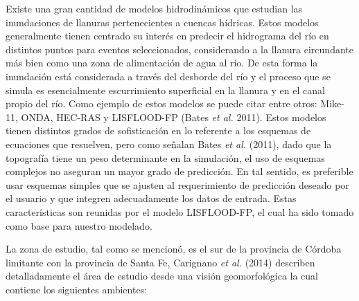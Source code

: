 \documentclass[10pt,a4paper, twoside]{report}
\begin{document}
Existe una gran cantidad de modelos hidrodinámicos que estudian las inundaciones de llanuras pertenecientes a cuencas hídricas. Estos modelos generalmente tienen centrado su interés en predecir el hidrograma del río en distintos puntos para eventos seleccionados, considerando a la llanura circundante más bien como una zona de alimentación de agua al río. De esta forma la inundación está considerada a través del desborde del río y el proceso que se simula es esencialmente escurrimiento superficial en la llanura y en el canal propio del río. Como ejemplo de estos modelos se puede citar entre otros: Mike-11, ONDA, HEC-RAS y LISFLOOD-FP (Bates \textit{et al.} 2011). Estos modelos tienen distintos grados de sofisticación en lo referente a los esquemas de ecuaciones que resuelven, pero como señalan Bates \textit{et al.} (2011), dado que la topografía tiene un peso determinante en la simulación, el uso de esquemas complejos no aseguran un mayor grado de predicción. En tal sentido, es preferible usar esquemas simples que se ajusten al requerimiento de predicción deseado por el usuario y que integren adecuadamente los datos de entrada. Estas características son reunidas por el modelo LISFLOOD-FP, el cual ha sido tomado como base para nuestro modelado.

La zona de estudio, tal como se mencionó, es el sur de la provincia de Córdoba limitante con la provincia de Santa Fe, Carignano \textit{et al.} (2014) describen detalladamente el área de estudio desde una visión geomorfológica la cual contiene los siguientes ambientes:
\end{document}
